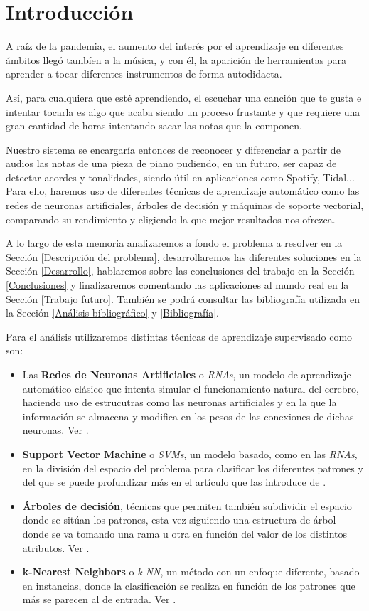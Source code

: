 \documentclass[12pt]{article}
\begin{document}
\section{Introducción}

A raíz de la pandemia, el aumento del interés por el aprendizaje en diferentes ámbitos llegó tambíen a la música, y con él, la aparición
de herramientas para aprender a tocar diferentes instrumentos de forma autodidacta.

\bigskip
Así, para cualquiera que esté aprendiendo, el escuchar una canción que te gusta e intentar tocarla es algo que acaba siendo un proceso
frustante y que requiere una gran cantidad de horas intentando sacar las notas que la componen.

\bigskip
Nuestro sistema se encargaría entonces de reconocer y diferenciar a partir de audios las notas de una pieza de piano
pudiendo, en un futuro, ser capaz de detectar acordes y tonalidades, siendo útil en aplicaciones como Spotify, Tidal... Para ello, haremos uso
de diferentes técnicas de aprendizaje automático como las redes de neuronas artificiales, árboles de decisión y máquinas de soporte vectorial,
comparando su rendimiento y eligiendo la que mejor resultados nos ofrezca.

\bigskip
A lo largo de esta memoria analizaremos a fondo el problema a resolver en la Sección \ref{Descripción del problema}, desarrollaremos las diferentes soluciones en la
Sección \ref{Desarrollo}, hablaremos sobre las conclusiones del trabajo en la Sección \ref{Conclusiones} y finalizaremos comentando las aplicaciones al mundo
real en la Sección \ref{Trabajo futuro}. También se podrá consultar las bibliografía utilizada en la Sección \ref{Análisis bibliográfico} y \ref{Bibliografía}.

\bigskip
Para el análisis utilizaremos distintas técnicas de aprendizaje supervisado como son:
\begin{itemize}
	\item Las \textbf{Redes de Neuronas Artificiales} o \textit{RNAs}, un modelo de aprendizaje automático clásico que
	intenta simular el funcionamiento natural del cerebro, haciendo uso de estrucutras como las neuronas artificiales y en la que
	la información se almacena y modifica en los pesos de las conexiones de dichas neuronas. Ver \cite{krogh2008artificial}.
	\item \textbf{Support Vector Machine} o \textit{SVMs}, un modelo basado, como en las \textit{RNAs}, en la división del espacio del problema para clasificar
	los diferentes patrones y del que se puede profundizar más en el artículo que las introduce de \cite{cortes1995support}.
	\item \textbf{Árboles de decisión}, técnicas que permiten también subdividir el espacio donde se sitúan los patrones, esta vez
	siguiendo una estructura de árbol donde se va tomando una rama u otra en función del valor de los distintos atributos. Ver \cite{myles2004introduction}.
	\item \textbf{ k-Nearest Neighbors} o \textit{k-NN}, un método con un enfoque diferente, basado en instancias, donde la clasificación
	se realiza en función de los patrones que más se parecen al de entrada. Ver \cite{guo2003knn}.
\end{itemize}
\newpage
\end{document}

